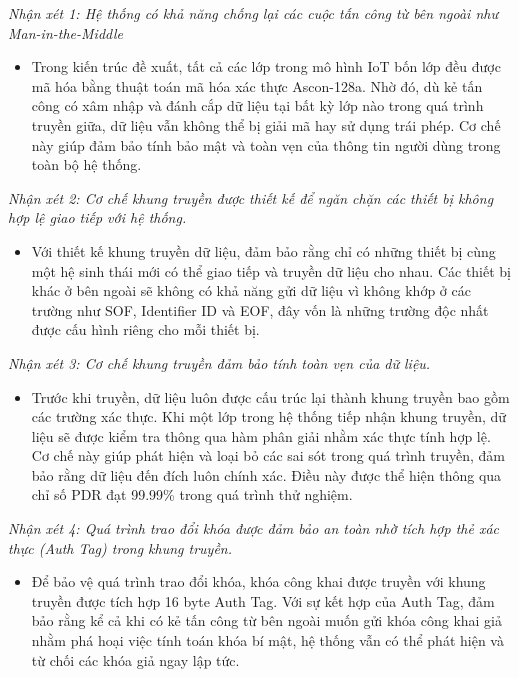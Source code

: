 \textit{Nhận xét 1: Hệ thống có khả năng chống lại các cuộc tấn công từ bên ngoài như Man-in-the-Middle}
\begin{itemize}
    \item Trong kiến trúc đề xuất, tất cả các lớp trong mô hình IoT bốn lớp đều được mã hóa bằng thuật toán mã hóa xác thực Ascon-128a. Nhờ đó, dù kẻ tấn công có xâm nhập và đánh cắp dữ liệu tại bất kỳ lớp nào trong quá trình truyền giữa, dữ liệu vẫn không thể bị giải mã hay sử dụng trái phép. Cơ chế này giúp đảm bảo tính bảo mật và toàn vẹn của thông tin người dùng trong toàn bộ hệ thống.
\end{itemize}

\textit{Nhận xét 2: Cơ chế khung truyền được thiết kế để ngăn chặn các thiết bị không hợp lệ giao tiếp với hệ thống.}
\begin{itemize}
    \item Với thiết kế khung truyền dữ liệu, đảm bảo rằng chỉ có những thiết bị cùng một hệ sinh thái mới có thể giao tiếp và truyền dữ liệu cho nhau. Các thiết bị khác ở bên ngoài sẽ không có khả năng gửi dữ liệu vì không khớp ở các trường như SOF, Identifier ID và EOF, đây vốn là những trường độc nhất được cấu hình riêng cho mỗi thiết bị.
\end{itemize}

\textit{Nhận xét 3: Cơ chế khung truyền đảm bảo tính toàn vẹn của dữ liệu.}
\begin{itemize}
    \item Trước khi truyền, dữ liệu luôn được cấu trúc lại thành khung truyền bao gồm các trường xác thực. Khi một lớp trong hệ thống tiếp nhận khung truyền, dữ liệu sẽ được kiểm tra thông qua hàm phân giải nhằm xác thực tính hợp lệ. Cơ chế này giúp phát hiện và loại bỏ các sai sót trong quá trình truyền, đảm bảo rằng dữ liệu đến đích luôn chính xác. Điều này được thể hiện thông qua chỉ số PDR đạt 99.99\% trong quá trình thử nghiệm.
\end{itemize}

\textit{Nhận xét 4: Quá trình trao đổi khóa được đảm bảo an toàn nhờ tích hợp thẻ xác thực (Auth Tag) trong khung truyền.}
\begin{itemize}
    \item Để bảo vệ quá trình trao đổi khóa, khóa công khai được truyền với khung truyền được tích hợp 16 byte Auth Tag. Với sự kết hợp của Auth Tag, đảm bảo rằng kể cả khi có kẻ tấn công từ bên ngoài muốn gửi khóa công khai giả nhằm phá hoại việc tính toán khóa bí mật, hệ thống vẫn có thể phát hiện và từ chối các khóa giả ngay lập tức. 
\end{itemize}

